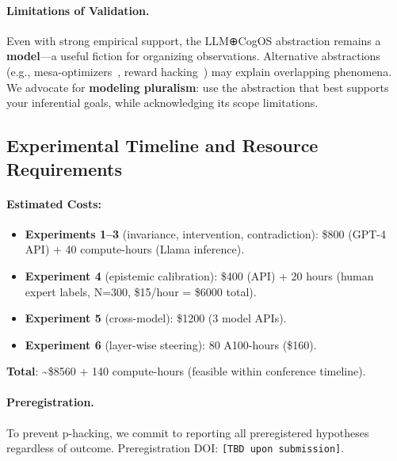 \documentclass[11pt]{article}
\begin{document}
\paragraph{Limitations of Validation.} Even with strong empirical support, the LLM⊕CogOS abstraction remains a \textbf{model}—a useful fiction for organizing observations. Alternative abstractions (e.g., mesa-optimizers~\citep{hubinger2019risks}, reward hacking~\citep{amodei2016concrete}) may explain overlapping phenomena. We advocate for \textbf{modeling pluralism}: use the abstraction that best supports your inferential goals, while acknowledging its scope limitations.

\subsection{Experimental Timeline and Resource Requirements}

\paragraph{Estimated Costs:}
\begin{itemize}
    \item \textbf{Experiments 1--3} (invariance, intervention, contradiction): \$800 (GPT-4 API) + 40 compute-hours (Llama inference).
    \item \textbf{Experiment 4} (epistemic calibration): \$400 (API) + 20 hours (human expert labels, N=300, \$15/hour = \$6000 total).
    \item \textbf{Experiment 5} (cross-model): \$1200 (3 model APIs).
    \item \textbf{Experiment 6} (layer-wise steering): 80 A100-hours (\$160).
\end{itemize}
\textbf{Total}: \textasciitilde\$8560 + 140 compute-hours (feasible within conference timeline).

\paragraph{Preregistration.} To prevent p-hacking, we commit to reporting all preregistered hypotheses regardless of outcome. Preregistration DOI: \texttt{[TBD upon submission]}.


\end{document}

